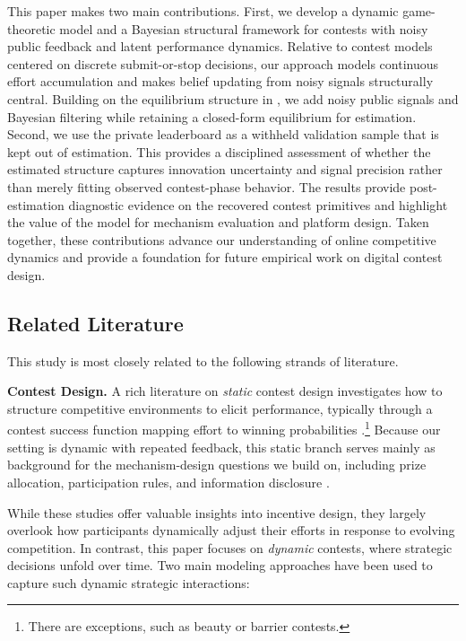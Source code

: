 \documentclass[mnsc]{informs3}
\begin{document}
This paper makes two main contributions.
First, we develop a dynamic game-theoretic model and a Bayesian structural framework for contests with noisy public feedback and latent performance dynamics.
Relative to contest models centered on discrete submit-or-stop decisions, our approach models continuous effort accumulation and makes belief updating from noisy signals structurally central.
Building on the equilibrium structure in \citet{Ryvkin2022Fight}, we add noisy public signals and Bayesian filtering while retaining a closed-form equilibrium for estimation.
Second, we use the private leaderboard as a withheld validation sample that is kept out of estimation.
This provides a disciplined assessment of whether the estimated structure captures innovation uncertainty and signal precision rather than merely fitting observed contest-phase behavior.
The results provide post-estimation diagnostic evidence on the recovered contest primitives and highlight the value of the model for mechanism evaluation and platform design.
Taken together, these contributions advance our understanding of online competitive dynamics and provide a foundation for future empirical work on digital contest design.



\subsection{Related Literature}

This study is most closely related to the following strands of literature.

\textbf{Contest Design.}
A rich literature on \textit{static} contest design \citep{ales2017optimal_award} investigates how to structure competitive environments to elicit performance, typically through a contest success function mapping effort to winning probabilities \citep{skaperdas1996contest}.\footnote{There are exceptions, such as beauty or barrier contests.}
Because our setting is dynamic with repeated feedback, this static branch serves mainly as background for the mechanism-design questions we build on, including prize allocation, participation rules, and information disclosure \citep{moldovanu2001optimal, ales2021number_of_players, bergemann2022optimal}.


While these studies offer valuable insights into incentive design, they largely overlook how participants dynamically adjust their efforts in response to evolving competition.
In contrast, this paper focuses on \textit{dynamic} contests, where strategic decisions unfold over time.
Two main modeling approaches have been used to capture such dynamic strategic interactions:
\end{document}
